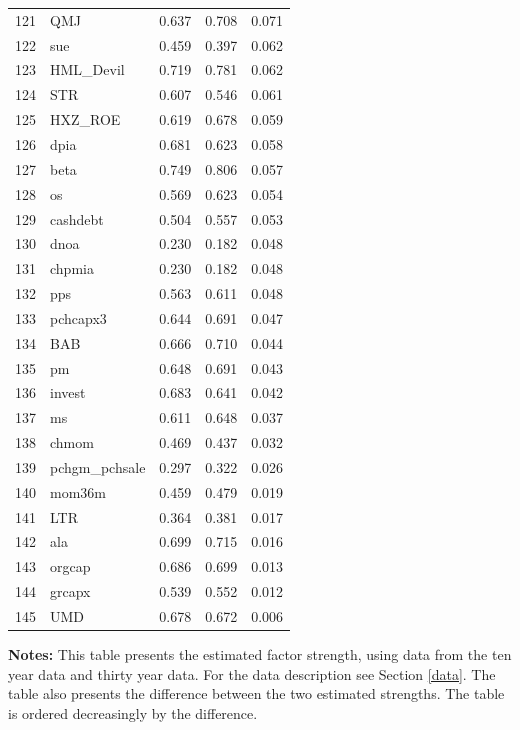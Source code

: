 \begin{footnotesize}
\begin{longtable}{rl|c|c|c}
		121 & QMJ & 0.637 & 0.708 & 0.071 \\ 
		122 & sue & 0.459 & 0.397 & 0.062 \\ 
		123 & HML\_Devil & 0.719 & 0.781 & 0.062 \\ 
		124 & STR & 0.607 & 0.546 & 0.061 \\ 
		125 & HXZ\_ROE & 0.619 & 0.678 & 0.059 \\ 
		126 & dpia & 0.681 & 0.623 & 0.058 \\ 
		127 & beta & 0.749 & 0.806 & 0.057 \\ 
		128 & os & 0.569 & 0.623 & 0.054 \\ 
		129 & cashdebt & 0.504 & 0.557 & 0.053 \\ 
		130 & dnoa & 0.230 & 0.182 & 0.048 \\ 
		131 & chpmia & 0.230 & 0.182 & 0.048 \\ 
		132 & pps & 0.563 & 0.611 & 0.048 \\ 
		133 & pchcapx3 & 0.644 & 0.691 & 0.047 \\ 
		134 & BAB & 0.666 & 0.710 & 0.044 \\ 
		135 & pm & 0.648 & 0.691 & 0.043 \\ 
		136 & invest & 0.683 & 0.641 & 0.042 \\ 
		137 & ms & 0.611 & 0.648 & 0.037 \\ 
		138 & chmom & 0.469 & 0.437 & 0.032 \\ 
		139 & pchgm\_pchsale & 0.297 & 0.322 & 0.026 \\ 
		140 & mom36m & 0.459 & 0.479 & 0.019 \\ 
		141 & LTR & 0.364 & 0.381 & 0.017 \\ 
		142 & ala & 0.699 & 0.715 & 0.016 \\ 
		143 & orgcap & 0.686 & 0.699 & 0.013 \\ 
		144 & grcapx & 0.539 & 0.552 & 0.012 \\ 
		145 & UMD & 0.678 & 0.672 & 0.006 \\ 
		\hline
	\end{longtable}

			\begin{minipage}{0.7\textwidth}
				
{\footnotesize {\bf Notes:} This table presents the estimated factor strength, using data from the ten year data and thirty year data. For the data description see Section \ref{data}. 
	The table also presents the difference between the two estimated strengths. 
	The table is ordered decreasingly by the difference. }
\end{minipage}

\end{footnotesize}



